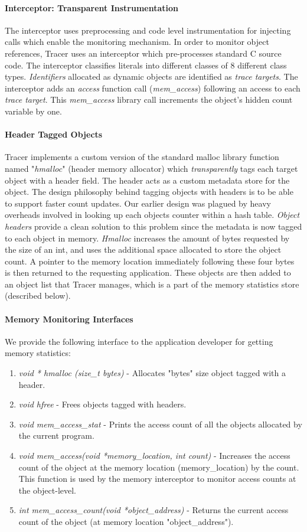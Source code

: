 \paragraph{Interceptor: Transparent Instrumentation}
The interceptor uses preprocessing and code level instrumentation for injecting calls which enable the monitoring mechanism. In order to monitor object references, Tracer uses an interceptor which pre-processes standard C source code. The interceptor classifies literals into different classes of 8 different class types. {\emph{Identifiers}} allocated as dynamic objects are identified as {\emph{trace targets}}. The interceptor adds an {\emph{access}} function call ({\emph{mem\_access}}) following an access to each {\emph{trace target}}. This {\emph{mem\_access}} library call increments the object's hidden count variable by one. 
\paragraph{Header Tagged Objects}
Tracer implements a custom version of the standard malloc library function named "{\emph{hmalloc}}" (header memory allocator) which {\emph{transparently}} tags each target object with a header field. The header acts as a custom metadata store for the object. The design philosophy behind tagging objects with headers is to be able to support faster count updates. Our earlier design was plagued by heavy overheads involved in looking up each objects counter within a hash table. {\emph{Object headers}} provide a clean solution to this problem since the metadata is now tagged to each object in memory. {\emph{Hmalloc}} increases the amount of bytes requested by the size of an int, and uses the additional space allocated to store the object count. A pointer to the memory location immediately following these four bytes is then returned to the requesting application. These objects are then added to an object list that Tracer manages, which is a part of the memory statistics store (described below).
\paragraph{Memory Monitoring Interfaces}
We provide the following interface to the application developer for getting memory statistics:
\begin{enumerate}
\item {\emph{void * hmalloc (size\_t bytes)}} - Allocates "bytes" size object tagged with a header.
\item {\emph{void hfree}} - Frees objects tagged with headers.
\item {\emph{void mem\_access\_stat}} - Prints the access count of all the objects allocated by the current program.
\item{\emph{void mem\_access(void *memory\_location, int count)}} - Increases the access count of the object at the memory location (memory\_location) by the count. This function is used by the memory interceptor to monitor access counts at the object-level.
\item {\emph{int mem\_access\_count(void *object\_address)}} - Returns the current access count of the object (at memory location "object\_address").
\end{enumerate}


